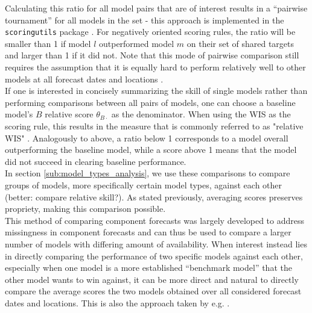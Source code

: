 Calculating this ratio for all model pairs that are of interest results in a ``pairwise tournament'' for all models in the set - this approach is implemented in the \texttt{scoringutils} package \citep{bosse_epiforecastsscoringutils_2022}. For negatively oriented scoring rules, the ratio will be smaller than 1 if model $l$ outperformed model $m$ on their set of shared targets and larger than 1 if it did not. Note that this mode of pairwise comparison still requires the assumption that it is equally hard to perform relatively well to other models at all forecast dates and locations \citep{cramer_evaluation_2022}.\\
If one is interested in concisely summarizing the skill of single models rather than performing comparisons between all pairs of models, one can choose a baseline model's $B$ relative score $\theta_{B\cdot}$ as the denominator. When using the WIS as the scoring rule, this results in the measure that is commonly referred to as "relative WIS" \citep{cramer_evaluation_2022}. Analogously to above, a ratio below 1 corresponds to a model overall outperforming the baseline model, while a score above 1 means that the model did not succeed in clearing baseline performance.\\
In section \ref{sub:model_types_analysis}, we use these comparisons to compare groups of models, more specifically certain model types, against each other (better: compare relative skill?). As stated previously, averaging scores preserves propriety, making this comparison possible.\\
This method of comparing component forecasts was largely developed to address missingness in component forecasts and can thus be used to compare a larger number of models with differing amount of availability. When interest instead lies in directly comparing the performance of two specific models against each other, especially when one model is a more established ``benchmark model'' that the other model wants to win against, it can be more direct and natural to directly compare the average scores the two models obtained over all considered forecast dates and locations. This is also the approach taken by e.g. \cite{bosse_comparing_2021-1}.\\
